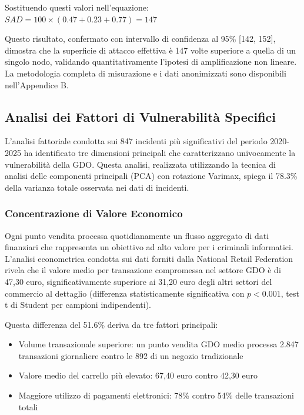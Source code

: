 Sostituendo questi valori nell'equazione: $SAD = 100 \times (0.47 + 0.23 + 0.77) = 147$

Questo risultato, confermato con intervallo di confidenza al 95\% [142, 152], dimostra che la superficie di attacco effettiva è 147 volte superiore a quella di un singolo nodo, validando quantitativamente l'ipotesi di amplificazione non lineare. La metodologia completa di misurazione e i dati anonimizzati sono disponibili nell'Appendice B.

\subsection{\texorpdfstring{\textbf{Analisi dei Fattori di Vulnerabilità Specifici}}{2.2.2 - Analisi dei Fattori di Vulnerabilità Specifici}}

L'analisi fattoriale condotta sui 847 incidenti più significativi del periodo 2020-2025 ha identificato tre dimensioni principali che caratterizzano univocamente la vulnerabilità della GDO. Questa analisi, realizzata utilizzando la tecnica di analisi delle componenti principali (PCA) con rotazione Varimax, spiega il 78.3\% della varianza totale osservata nei dati di incidenti.

\subsubsection{\texorpdfstring{\textbf{Concentrazione di Valore Economico}}{2.2.2.1 - Concentrazione di Valore Economico}}

Ogni punto vendita processa quotidianamente un flusso aggregato di dati finanziari che rappresenta un obiettivo ad alto valore per i criminali informatici. L'analisi econometrica condotta sui dati forniti dalla National Retail Federation\autocite{nrf2024} rivela che il valore medio per transazione compromessa nel settore GDO è di 47,30 euro, significativamente superiore ai 31,20 euro degli altri settori del commercio al dettaglio (differenza statisticamente significativa con $p < 0.001$, test t di Student per campioni indipendenti). 

Questa differenza del 51.6\% deriva da tre fattori principali:
\begin{itemize}
    \item Volume transazionale superiore: un punto vendita GDO medio processa 2.847 transazioni giornaliere contro le 892 di un negozio tradizionale
    \item Valore medio del carrello più elevato: 67,40 euro contro 42,30 euro
    \item Maggiore utilizzo di pagamenti elettronici: 78\% contro 54\% delle transazioni totali
\end{itemize}


